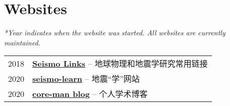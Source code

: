 \section*{Websites}

\textit{*Year indicates when the website was started. All websites are currently maintained.}

\begin{tabular}{p{} p{}}
2018 &	\textbf{\href{https://seismo-learn.org/links/}{Seismo Links}} -- 地球物理和地震学研究常用链接 \\
2020 &	\textbf{\href{https://seismo-learn.org/}{seismo-learn}} -- 地震“学”网站 \\
2020 &	\textbf{\href{https://core-man.github.io/blog/}{core-man blog}} -- 个人学术博客 \\
\end{tabular}
